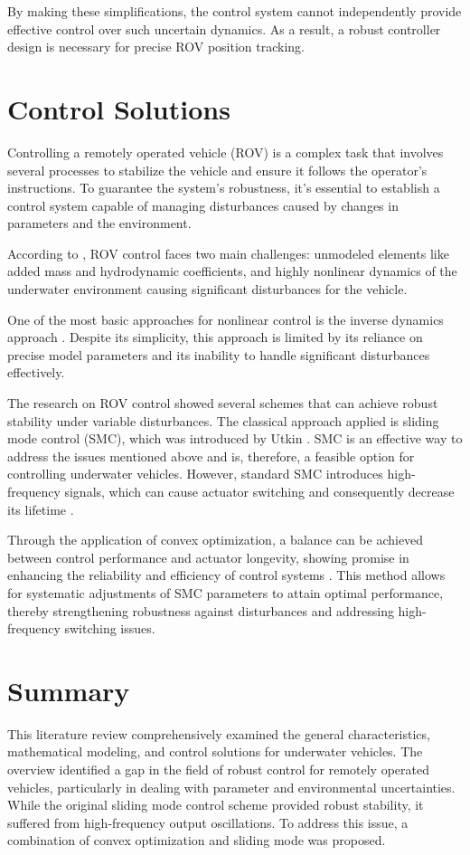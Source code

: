     By making these simplifications, the control system cannot independently provide effective control over such uncertain dynamics. As a result, a robust controller design is necessary for precise ROV position tracking.

\section{Control Solutions}

    Controlling a remotely operated vehicle (ROV) is a complex task that involves several processes to stabilize the vehicle and ensure it follows the operator's instructions. To guarantee the 
    system's robustness, it's essential to establish a control system capable of managing disturbances caused by changes in parameters and the environment.

    According to \cite{overview, control_overview}, ROV control faces two main challenges: unmodeled elements like added mass and hydrodynamic coefficients, and highly nonlinear dynamics of the underwater environment causing significant disturbances for the vehicle.

    One of the most basic approaches for nonlinear control is the inverse dynamics approach \cite{spong_book}. Despite its simplicity, this approach is limited by its reliance on precise model parameters and its inability to handle significant disturbances effectively.

    The research on ROV control showed several schemes that can achieve robust stability under variable disturbances. The classical approach applied is sliding mode control (SMC), which was
    introduced by Utkin \cite{utkin}. SMC is an effective way to address the issues mentioned above and is, therefore, a feasible option for controlling underwater vehicles. However, standard SMC introduces high-frequency signals, which can cause actuator switching and consequently decrease its lifetime \cite{slotine, spong}.

    Through the application of convex optimization, a balance can be achieved between control performance and actuator longevity, showing promise in enhancing the reliability and efficiency of control systems \cite{utkin_opt, utkin_book}. This method allows for systematic adjustments of SMC parameters to attain optimal 
    performance, thereby strengthening robustness against disturbances and addressing high-frequency switching issues.

\section{Summary}

    This literature review comprehensively examined the general characteristics, mathematical modeling,
    and control solutions for underwater vehicles. The overview identified a gap in the field of robust
    control for remotely operated vehicles, particularly in dealing with parameter and environmental
    uncertainties. While the original sliding mode control scheme provided robust stability, it suffered
    from high-frequency output oscillations. To address this issue, a combination of convex optimization and
    sliding mode was proposed.
